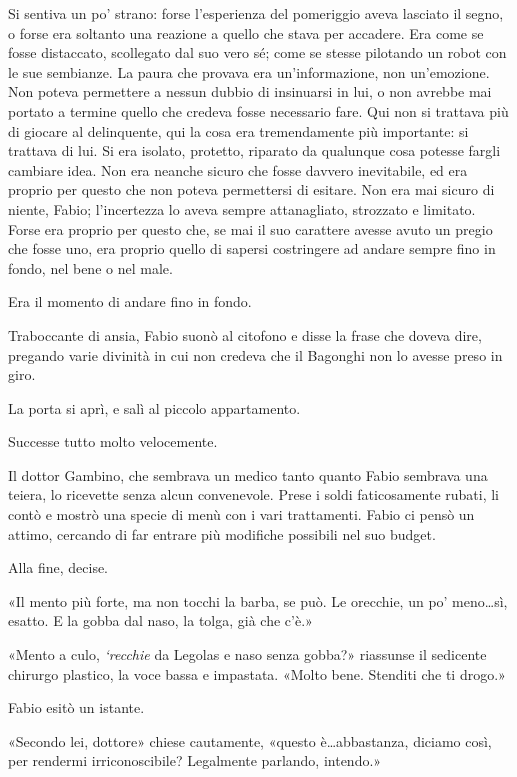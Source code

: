 Si sentiva un po' strano: forse l'esperienza del pomeriggio aveva lasciato il segno, o forse era soltanto una reazione a quello che stava per accadere. Era come se fosse distaccato, scollegato dal suo vero sé; come se stesse pilotando un robot con le sue sembianze. La paura che provava era un'informazione, non un'emozione. Non poteva permettere a nessun dubbio di insinuarsi in lui, o non avrebbe mai portato a termine quello che credeva fosse necessario fare. Qui non si trattava più di giocare al delinquente, qui la cosa era tremendamente più importante: si trattava di lui. Si era isolato, protetto, riparato da qualunque cosa potesse fargli cambiare idea. Non era neanche sicuro che fosse davvero inevitabile, ed era proprio per questo che non poteva permettersi di esitare. Non era mai sicuro di niente, Fabio; l'incertezza lo aveva sempre attanagliato, strozzato e limitato. Forse era proprio per questo che, se mai il suo carattere avesse avuto un pregio che fosse uno, era proprio quello di sapersi costringere ad andare sempre fino in fondo, nel bene o nel male.

Era il momento di andare fino in fondo.

Traboccante di ansia, Fabio suonò al citofono e disse la frase che doveva dire, pregando varie divinità in cui non credeva che il Bagonghi non lo avesse preso in giro.

La porta si aprì, e salì al piccolo appartamento.

Successe tutto molto velocemente.

Il dottor Gambino, che sembrava un medico tanto quanto Fabio sembrava una teiera, lo ricevette senza alcun convenevole. Prese i soldi faticosamente rubati, li contò e mostrò una specie di menù con i vari trattamenti. Fabio ci pensò un attimo, cercando di far entrare più modifiche possibili nel suo budget.

Alla fine, decise.

«Il mento più forte, ma non tocchi la barba, se può. Le orecchie, un po' meno\ldots{}sì, esatto. E la gobba dal naso, la tolga, già che c'è.»

«Mento a culo, \emph{`recchie} da Legolas e naso senza gobba?» riassunse il sedicente chirurgo plastico, la voce bassa e impastata. «Molto bene. Stenditi che ti drogo.»

Fabio esitò un istante.

«Secondo lei, dottore» chiese cautamente, «questo è\ldots{}abbastanza, diciamo così, per rendermi irriconoscibile? Legalmente parlando, intendo.»

